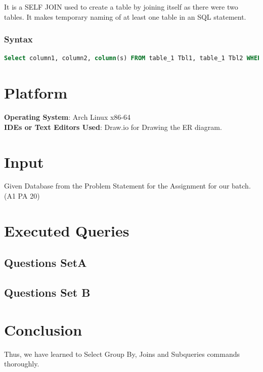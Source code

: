 \documentclass[11pt]{article}
\begin{document}
It is a SELF JOIN used to create a table by joining itself as there were two tables. It makes temporary naming of at least one table in an SQL statement.

\subsubsection*{Syntax}

\begin{lstlisting}[language=sql]
	Select column1, column2, column(s) FROM table_1 Tbl1, table_1 Tbl2 WHERE condition;  
\end{lstlisting}

\section{Platform}
\textbf{Operating System}: Arch Linux x86-64 \\
\textbf{IDEs or Text Editors Used}: Draw.io for Drawing the ER diagram.


\section{Input}
Given Database from the Problem Statement for the Assignment for our batch. (A1 PA 20)

\section{Executed Queries}

\subsection{Questions SetA}



\subsection{Questions Set B}




\section{Conclusion}
Thus, we have learned to Select Group By, Joins and Subqueries commands thoroughly.
\clearpage
\end{document}
